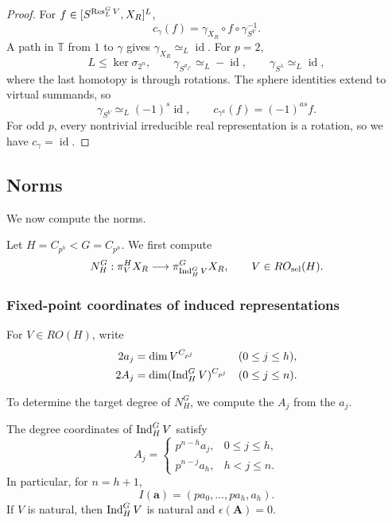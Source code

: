 \begin{proof}
For $f\in[S^{\operatorname{Res}_L^G V},X_R]^L$,
\[
c_\gamma(f)
=\gamma_{X_R}\circ f\circ\gamma_{S^V}^{-1}.
\]
A path in $\mathbb T$ from $1$ to $\gamma$ gives
$\gamma_{X_R}\simeq_L\operatorname{id}$.
For $p=2$,
\[
L\leq\ker\sigma_{2^n},\qquad
\gamma_{S^{\sigma_{2^n}}}\simeq_L-\operatorname{id},
\qquad
\gamma_{S^\lambda}\simeq_L\operatorname{id},
\]
where the last homotopy is through rotations.
The sphere identities extend to virtual summands, so
\[
\gamma_{S^V}\simeq_L(-1)^s\operatorname{id},
\qquad
c_{\gamma^a}(f)=(-1)^{as}f.
\]
For odd $p$, every nontrivial irreducible real representation
is a rotation, so we have $c_\gamma=\operatorname{id}$.
\end{proof}

\subsection{Norms}\label{subsec:graded-norms}
We now compute the norms.

Let $H=C_{p^h}<G=C_{p^n}$. We first compute
\[
N_H^G:\pi_V^H X_R\longrightarrow\pi_{\operatorname{Ind}_H^G V}^G X_R,
\qquad V\in RO_{\mathrm{sel}}(H).
\]

\subsubsection{Fixed-point coordinates of induced representations}\label{subsubsec:selected-degree-norms}
For $V\in RO(H)$, write
\[
\begin{aligned}
2a_j&=\dim V^{C_{p^j}} &&(0\le j\le h),\\
2A_j&=\dim(\operatorname{Ind}_H^G V)^{C_{p^j}} &&(0\le j\le n).
\end{aligned}
\]

To determine the target degree of $N_H^G$, we compute the $A_j$
from the $a_j$.

\begin{proposition}\label{prop:induction-of-degrees}
The degree coordinates of $\operatorname{Ind}_H^G V$ satisfy
\begin{equation}\label{eq:period-repair-induced-degree}
A_j=\begin{cases}
p^{n-h}a_j,&0\le j\le h,\\
p^{n-j}a_h,&h<j\le n.
\end{cases}
\end{equation}
In particular, for $n=h+1$,
\begin{equation*}
I(\mathbf a)=(pa_0,\ldots,pa_h,a_h).
\end{equation*}
If $V$ is natural, then $\operatorname{Ind}_H^G V$ is natural and
$\epsilon(\mathbf A)=0$.
\end{proposition}

